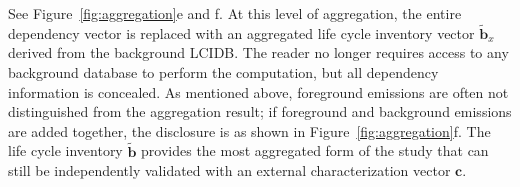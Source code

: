 See Figure~\ref{fig:aggregation}e and f. At this level of aggregation, the entire dependency vector is replaced with an aggregated life cycle inventory vector $\tilde{\mathbf{b}}_x$ derived from the background LCIDB.  The reader no longer requires access to any background database to perform the computation, but all dependency information is concealed.  As mentioned above, foreground emissions are often not distinguished from the aggregation result; if foreground and background emissions are added together, the disclosure is as shown in Figure~\ref{fig:aggregation}f.  The life cycle inventory $\tilde{\mathbf{b}}$ provides the most aggregated form of the study that can still be independently validated with an external characterization vector $\mathbf{c}$.  

